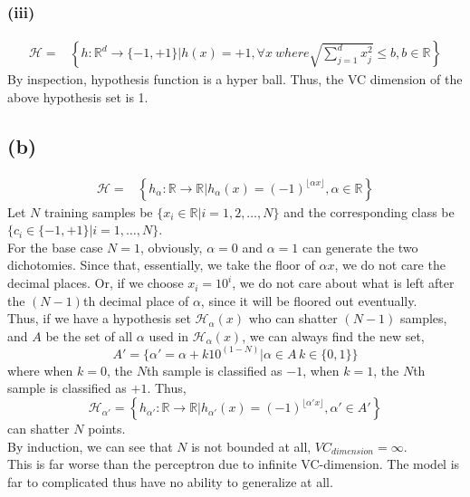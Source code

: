 \documentclass[11pt]{article}
\begin{document}
\subsubsection*{(iii)}
\begin{equation}
\begin{split}
\mathcal{H}=&\left\{h:\mathbb{R}^d\rightarrow\{-1,+1\}|h(x)=+1,\forall x\ where \sqrt{\sum_{j=1}^{d} x_j^2}\le b, b\in\mathbb{R}\right\}
\end{split}
\end{equation}
By inspection, hypothesis function is a hyper ball. Thus, the VC dimension of the above hypothesis set is 1.

\pagebreak
\subsection*{(b)}
\begin{equation}
\begin{split}
\mathcal{H}=&\left\{h_\alpha:\mathbb{R}\rightarrow\mathbb{R}|h_\alpha(x)=(-1)^{\lfloor \alpha x\rfloor},\alpha\in\mathbb{R}\right\}
\end{split}
\end{equation}
Let $N$ training samples be $\{x_i\in\mathbb{R}|i=1,2,\dots,N\}$ and the corresponding class be $\{c_i\in\{-1,+1\}|i=1,\dots,N\}$.\\
For the base case $N=1$, obviously, $\alpha = 0$ and $\alpha = 1$ can generate the two dichotomies. Since that, essentially, we take the floor of $\alpha x$, we do not care the decimal places. Or, if we choose $x_i = 10^i$, we do not care about what is left after the $(N-1)$th decimal place of $\alpha$, since it will be floored out eventually.\\
Thus, if we have a hypothesis set $\mathcal{H}_{\alpha}(x)$ who can shatter $(N-1)$ samples, and $A$ be the set of all $\alpha$ used in $\mathcal{H}_{\alpha}(x)$, we can always find the new set,
$$A'=\{\alpha'=\alpha + k10^{(1-N)}|\alpha\in A\, k\in\{0,1\} \}$$ 
where when $k=0$, the $N$th sample is classified as $-1$, when $k=1$, the $N$th sample is classified as $+1$.
Thus, 
$$\mathcal{H}_{\alpha'}=\left\{h_{\alpha'}:\mathbb{R}\rightarrow\mathbb{R}|h_{\alpha'}(x)=(-1)^{\lfloor \alpha' x\rfloor},\alpha'\in A'\right\}$$
can shatter $N$ points.\\
By induction, we can see that $N$ is not bounded at all, $VC_{dimension}=\infty$.\\
This is far worse than the perceptron due to infinite VC-dimension. The model is far to complicated thus have no ability to generalize at all.
\end{document}

